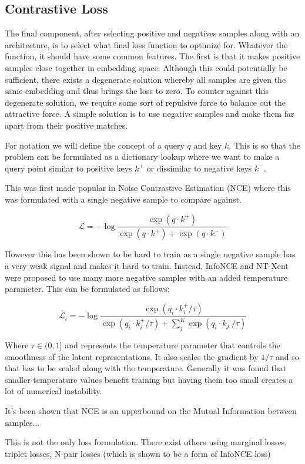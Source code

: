 \documentclass[12pt]{article}
\begin{document}
\subsection{Contrastive Loss}

The final component, after selecting positive and negatives samples along with an architecture, is to select what final loss function to optimize for. Whatever the function, it should have some common features. The first is that it makes positive samples close together in embedding space. Although this could potentially be sufficient, there exists a degenerate solution whereby all samples are given the same embedding and thus brings the loss to zero. To counter against this degenerate solution, we require some sort of repulsive force to balance out the attractive force. A simple solution is to use negative samples and make them far apart from their positive matches.
%

For notation we will define the concept of a query $q$ and key $k$. This is so that the problem can be formulated as a dictionary lookup where we want to make a query point similar to positive keys $k^+$ or dissimilar to negative keys $k^-$.


This was first made popular in Noise Contrastive Estimation (NCE) where this was formulated with a single negative sample to compare against.

$$\mathcal{L} = -\log \frac{\exp(q \cdot k^{+})}{\exp(q \cdot k^{+}) + \exp(q \cdot k^{-})}$$
%

However this has been shown to be hard to train as a single negative sample has a very weak signal and makes it hard to train. Instead, InfoNCE and NT-Xent were proposed to use many more negative samples with an added temperature parameter. This can be formulated as follows:

$$\mathcal{L}_{i} = -\log \frac{\exp(q_{i} \cdot k^{+}_{i} / \tau)}{\exp(q_{i} \cdot k^{+}_{i} / \tau) + \sum^{K}_{j}\exp(q_{i} \cdot k^{-}_{j} / \tau)}$$

Where $\tau \in (0,1]$ and represents the temperature parameter that controls the smoothness of the latent representations. It also scales the gradient by $1/\tau$ and so that has to be scaled along with the temperature. Generally it was found that smaller temperature values benefit training but having them too small creates a lot of numerical instability.

It's been shown that NCE is an upperbound on the Mutual Information between samples...

This is not the only loss formulation. There exist others using marginal losses, triplet losses, N-pair losses (which is shown to be a form of InfoNCE loss)
\end{document}
